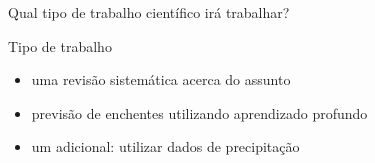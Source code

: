 \begin{frame}{Qual tipo de trabalho científico irá trabalhar?}
    \begin{block}{Tipo de trabalho}
        \begin{itemize}
            \item uma revisão sistemática acerca do assunto
            \item previsão de enchentes utilizando aprendizado profundo
            \item um adicional: utilizar dados de precipitação
        \end{itemize}
    \end{block}
\end{frame}
